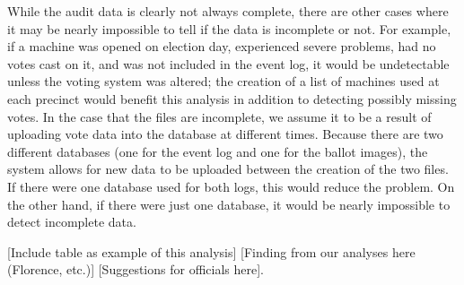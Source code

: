 While the audit data is clearly not always complete, there are other cases where it may be nearly impossible to tell if the data is incomplete or not.  For example, if a machine was opened on election day, experienced severe problems, had no votes cast on it, and was not included in the event log, it would be undetectable unless the voting system was altered; the creation of a list of machines used at each precinct would benefit this analysis in addition to detecting possibly missing votes.  In the case that the files are incomplete, we assume it to be a result of uploading vote data into the database at different times.  Because there are two different databases (one for the event log and one for the ballot images), the system allows for new data to be uploaded between the creation of the two files.  If there were one database used for both logs, this would reduce the problem.  On the other hand, if there were just one database, it would be nearly impossible to detect incomplete data.  

[Include table as example of this analysis] [Finding from our analyses here (Florence, etc.)] [Suggestions for officials here].

